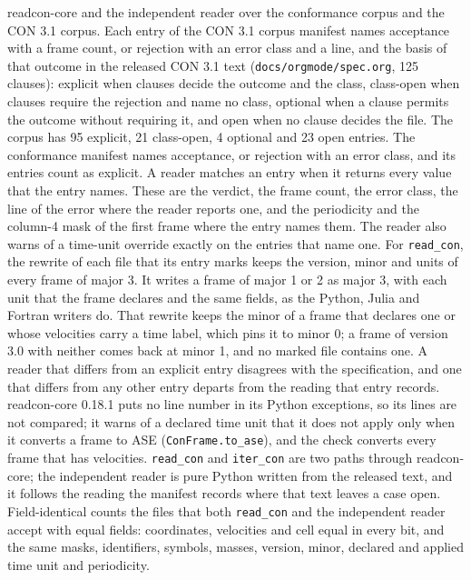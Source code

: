\begin{table}[tbp]
\centering
\small
\caption{readcon-core and the independent reader over the conformance corpus and the CON 3.1 corpus.
Each entry of the CON 3.1 corpus manifest names acceptance with a frame count, or rejection with an error class and a line, and the basis of that outcome in the released CON 3.1 text (\texttt{docs/orgmode/spec.org}, 125 clauses): explicit when clauses decide the outcome and the class, class-open when clauses require the rejection and name no class, optional when a clause permits the outcome without requiring it, and open when no clause decides the file.
The corpus has 95 explicit, 21 class-open, 4 optional and 23 open entries.
The conformance manifest names acceptance, or rejection with an error class, and its entries count as explicit.
A reader matches an entry when it returns every value that the entry names.
These are the verdict, the frame count, the error class, the line of the error where the reader reports one, and the periodicity and the column-4 mask of the first frame where the entry names them.
The reader also warns of a time-unit override exactly on the entries that name one.
For \texttt{read\_con}, the rewrite of each file that its entry marks keeps the version, minor and units of every frame of major 3.
It writes a frame of major 1 or 2 as major 3, with each unit that the frame declares and the same fields, as the Python, Julia and Fortran writers do.
That rewrite keeps the minor of a frame that declares one or whose velocities carry a time label, which pins it to minor 0; a frame of version 3.0 with neither comes back at minor 1, and no marked file contains one.
A reader that differs from an explicit entry disagrees with the specification, and one that differs from any other entry departs from the reading that entry records.
readcon-core 0.18.1 puts no line number in its Python exceptions, so its lines are not compared; it warns of a declared time unit that it does not apply only when it converts a frame to ASE (\texttt{ConFrame.to\_ase}), and the check converts every frame that has velocities.
\texttt{read\_con} and \texttt{iter\_con} are two paths through readcon-core; the independent reader is pure Python written from the released text, and it follows the reading the manifest records where that text leaves a case open.
Field-identical counts the files that both \texttt{read\_con} and the independent reader accept with equal fields: coordinates, velocities and cell equal in every bit, and the same masks, identifiers, symbols, masses, version, minor, declared and applied time unit and periodicity.}

\end{table}
